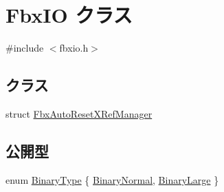 \hypertarget{class_fbx_i_o}{}\section{Fbx\+IO クラス}
\label{class_fbx_i_o}


{\ttfamily \#include $<$fbxio.\+h$>$}

\subsection*{クラス}
\begin{DoxyCompactItemize}
\item 
struct \hyperlink{struct_fbx_i_o_1_1_fbx_auto_reset_x_ref_manager}{Fbx\+Auto\+Reset\+X\+Ref\+Manager}
\end{DoxyCompactItemize}
\subsection*{公開型}
\begin{DoxyCompactItemize}
\item 
enum \hyperlink{class_fbx_i_o_ad0532f36367fa6b750993000dfb8ed1e}{Binary\+Type} \{ \hyperlink{class_fbx_i_o_ad0532f36367fa6b750993000dfb8ed1eaf6a4bfa7cf38e5cf98cc23f8ece8c7d3}{Binary\+Normal}, 
\hyperlink{class_fbx_i_o_ad0532f36367fa6b750993000dfb8ed1eadc2f299bd32d8da3c25f13d70125376f}{Binary\+Large}
 \}
\end{DoxyCompactItemize}
